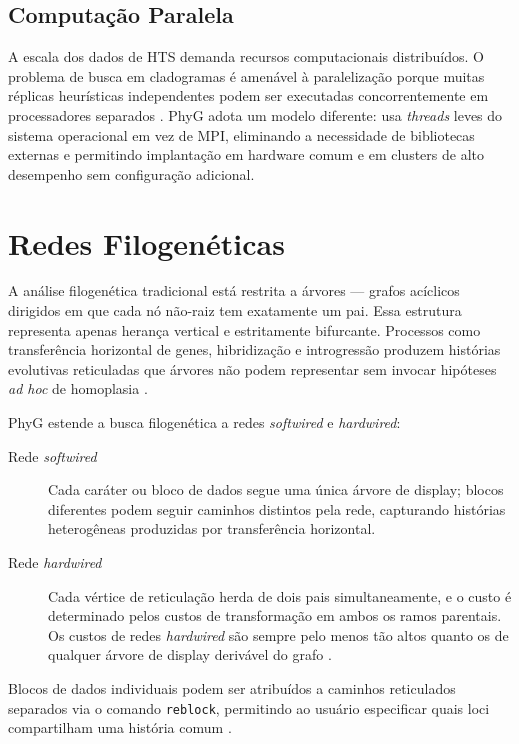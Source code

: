 \subsection{Computação Paralela}

A escala dos dados de HTS demanda recursos computacionais distribuídos. O problema de busca em cladogramas é amenável à paralelização porque muitas réplicas heurísticas independentes podem ser executadas concorrentemente em processadores separados \parencite{wheeleretal2006}. PhyG \parencite{wheeleretal2024} adota um modelo diferente: usa \textit{threads} leves do sistema operacional em vez de MPI, eliminando a necessidade de bibliotecas externas e permitindo implantação em hardware comum e em clusters de alto desempenho sem configuração adicional.

\section{Redes Filogenéticas}
\label{sec:redes}

A análise filogenética tradicional está restrita a árvores --- grafos acíclicos dirigidos em que cada nó não-raiz tem exatamente um pai. Essa estrutura representa apenas herança vertical e estritamente bifurcante. Processos como transferência horizontal de genes, hibridização e introgressão produzem histórias evolutivas reticuladas que árvores não podem representar sem invocar hipóteses \textit{ad hoc} de homoplasia \parencite{wheeleretal2024}.

PhyG \parencite{wheeleretal2024} estende a busca filogenética a redes \textit{softwired} e \textit{hardwired}:

\begin{description}
    \item[Rede \textit{softwired}] Cada caráter ou bloco de dados segue uma única árvore de display; blocos diferentes podem seguir caminhos distintos pela rede, capturando histórias heterogêneas produzidas por transferência horizontal.

    \item[Rede \textit{hardwired}] Cada vértice de reticulação herda de dois pais simultaneamente, e o custo é determinado pelos custos de transformação em ambos os ramos parentais. Os custos de redes \textit{hardwired} são sempre pelo menos tão altos quanto os de qualquer árvore de display derivável do grafo \parencite{wheeleretal2024}.
\end{description}

Blocos de dados individuais podem ser atribuídos a caminhos reticulados separados via o comando \texttt{reblock}, permitindo ao usuário especificar quais loci compartilham uma história comum \parencite{wheeleretal2024}.


